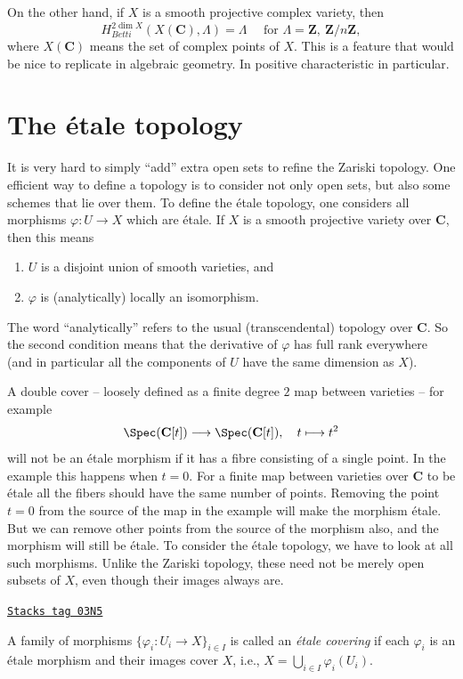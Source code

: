 \medskip\noindent
On the other hand, if $X$ is a smooth projective complex variety, then
$$
H_{Betti}^{2 \dim X}(X (\mathbf{C}), \Lambda) = \Lambda \quad \text{ for }
\Lambda = \mathbf{Z}, \ \mathbf{Z}/n\mathbf{Z},
$$
where $X(\mathbf{C})$ means the set of complex points of $X$. This is a feature
that would be nice to replicate in algebraic geometry. In positive
characteristic in particular.

\section{The \'etale topology}
\label{etale-cohomology-section-etale-topology}
It is very hard to simply ``add'' extra open sets to refine the Zariski
topology. One efficient way to define a topology is to consider not only open
sets, but also some schemes that lie over them. To define the \'etale topology,
one considers all morphisms $\varphi : U \to X$ which are \'etale. If
$X$ is a smooth projective variety over $\mathbf{C}$, then this means
\begin{enumerate}
\item $U$ is a disjoint union of smooth varieties, and
\item $\varphi$ is (analytically) locally an isomorphism.
\end{enumerate}
The word ``analytically'' refers to the usual (transcendental) topology over
$\mathbf{C}$. So the second condition means that the derivative of $\varphi$
has full rank everywhere (and in particular all the components of $U$
have the same dimension as $X$).

\medskip\noindent
A double cover -- loosely defined as a finite degree $2$ map between varieties
-- for example
$$
\Spec(\mathbf{C}[t])
\longrightarrow
\Spec(\mathbf{C}[t]),
\quad t \longmapsto t^2
$$
will not be an \'etale morphism if it has a fibre consisting of a single point.
In the example this happens when $t = 0$. For a finite map between varieties
over $\mathbf{C}$ to be \'etale all the fibers should have the same number of
points. Removing the point $t = 0$ from the source of the map in the example
will make the morphism \'etale. But we can remove other points from the source
of the morphism also, and the morphism will still be \'etale.  To consider the
\'etale topology, we have to look at all such morphisms. Unlike the Zariski
topology, these need not be merely open subsets of $X$, even though their
images always are.

\begin{definition}
\label{etale-cohomology-definition-etale-covering-initial}
\href{https://stacks.math.columbia.edu/tag/03N5}{\texttt{Stacks tag 03N5}}

A family of morphisms $\{ \varphi_i : U_i \to X\}_{i \in I}$ is
called an {\it \'etale covering} if each $\varphi_i$ is an \'etale morphism
and their images cover $X$, i.e.,
$X = \bigcup_{i \in I} \varphi_i(U_i)$.
\end{definition}

